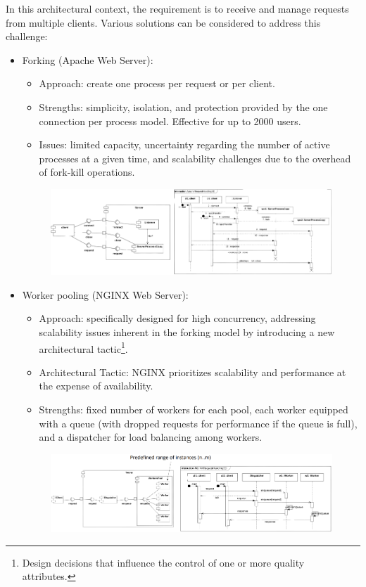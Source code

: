 In this architectural context, the requirement is to receive and manage requests from multiple clients. 
Various solutions can be considered to address this challenge:
\begin{itemize}
    \item Forking (Apache Web Server): 
        \begin{itemize}
            \item Approach: create one process per request or per client.
            \item Strengths: simplicity, isolation, and protection provided by the one connection per process model. 
                Effective for up to 2000 users.
            \item Issues: limited capacity, uncertainty regarding the number of active processes at a given time, and scalability challenges due to the overhead of fork-kill operations.
        \end{itemize}
        \begin{figure}[H]
            \centering
            \includegraphics[width=0.75\linewidth]{images/fork.png}
        \end{figure}
    \item Worker pooling (NGINX Web Server): 
        \begin{itemize}
            \item Approach: specifically designed for high concurrency, addressing scalability issues inherent in the forking model by introducing a new architectural tactic\footnote{Design decisions that influence the control of one or more quality attributes.}.
            \item Architectural Tactic: NGINX prioritizes scalability and performance at the expense of availability.
            \item Strengths: fixed number of workers for each pool, each worker equipped with a queue (with dropped requests for performance if the queue is full), and a dispatcher for load balancing among workers.
        \end{itemize}    
        \begin{figure}[H]
            \centering
            \includegraphics[width=0.75\linewidth]{images/work.png}
        \end{figure}
\end{itemize}

